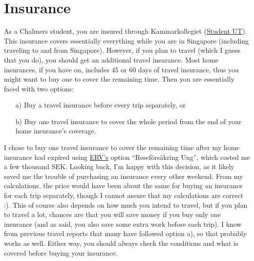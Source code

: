 \section*{Insurance}
{}
As a Chalmers student, you are insured through Kammarkollegiet (\href{https://www.kammarkollegiet.se/vara-tjanster/forsakring-och-riskhantering/forsakringar-for-studier-och-utlandska-besokare/utresande-utbytesstudenter-student-ut}{Student UT}). This insurance covers essentially everything while you are in Singapore (including traveling to and from Singapore). However, if you plan to travel (which I guess that you do), you should get an additional travel insurance. Most home insurances, if you have on, includes 45 or 60 days of travel insurance, thus you might want to buy one to cover the remaining time. Then you are essentially faced with two options:
\begin{itemize}
    \item[a)] Buy a travel insurance before every trip separately, or
    \item[b)] Buy one travel insurance to cover the whole period from the end of your home insurance's coverage. 
\end{itemize}
I chose to buy one travel insurance to cover the remaining time after my home insurance had expired using \href{https://www.erv.se/privat/vara-reseforsakringar/reseforsakring-ung/}{ERV's} option ``Reseförsäkring Ung'', which costed me a few thousand SEK. Looking back, I'm happy with this decision, as it likely saved me the trouble of purchasing an insurance every other weekend. From my calculations, the price would have been about the same for buying an insurance for each trip separately, though I cannot assure that my calculations are correct :). This of course also depends on how much you intend to travel, but if you plan to travel a lot, chances are that you will save money if you buy only one insurance (and as said, you also save some extra work before each trip). I know from previous travel reports that many have followed option a), so that probably works as well. Either way, you should always check the conditions and what is covered before buying your insurance.

